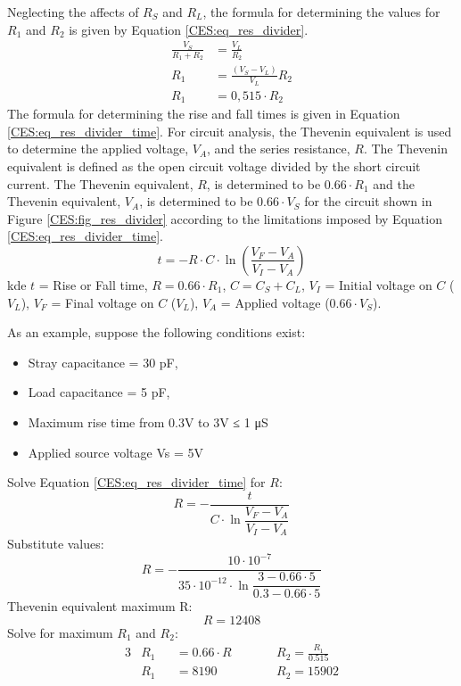         Neglecting the affects of $R_S$ and $R_L$, the formula for determining the values for $R_1$
        and $R_2$ is given by Equation \ref{CES:eq_res_divider}.
        \begin{align}\label{CES:eq_res_divider}
          \frac{V_S}{R_1+R_2} &= \frac{V_L}{R_2}           \nonumber \\
                          R_1 &= \frac{(V_S-V_L)}{V_L}R_2  \nonumber \\
                          R_1 &= 0,515\cdot R_2
        \end{align}      
        The formula for determining the rise and fall times is given in Equation
        \ref{CES:eq_res_divider_time}. For circuit analysis, the Thevenin equivalent is used to
        determine the applied voltage, $V_A$, and the series resistance, $R$.
        The Thevenin equivalent is defined as the open circuit voltage divided by the short circuit
        current. The Thevenin equivalent, $R$, is determined to be $0.66\cdot R_1$ and the Thevenin
        equivalent, $V_A$, is determined to be $0.66\cdot V_S$ for the circuit shown in  Figure
        \ref{CES:fig_res_divider} according to the limitations imposed by Equation
        \ref{CES:eq_res_divider_time}.
        \begin{equation}\label{CES:eq_res_divider_time}
          t = - R\cdot C \cdot \ln\left(\frac{V_F-V_A}{V_I-V_A}\right)
        \end{equation}  
        kde $t$ = Rise or Fall time, $R = 0.66\cdot R_1$, $C = C_S+C_L$, $V_I$ = Initial voltage on
        $C$ ($V_L$), $V_F$ = Final voltage on $C$ ($V_L$), $V_A$ = Applied voltage ($0.66\cdot V_S$). 
        \begin{example} As an example, suppose the following conditions exist:
          \begin{itemize}[noitemsep]
            \item Stray capacitance = 30 pF,
            \item Load capacitance = 5 pF,
            \item Maximum rise time from 0.3V to 3V ≤ 1 μS
            \item Applied source voltage Vs = 5V
          \end{itemize}
          Solve Equation \ref{CES:eq_res_divider_time} for $R$:  
          \begin{equation*}
            R = - \dfrac{t}{C\cdot\ln\dfrac{V_F-V_A}{V_I-V_A}}
          \end{equation*}   
          Substitute values:
          \begin{equation*}
            R = - \dfrac{10\cdot10^{-7}}{35\cdot10^{-12}\cdot
                  \ln\dfrac{3-0.66\cdot5}{0.3-0.66\cdot5}}
          \end{equation*}               
          Thevenin equivalent maximum R: $$R = 12408$$
          Solve for maximum $R_1$ and $R_2$:
          \begin{alignat}{3}
            & R_1 &&= 0.66\cdot R  \qquad &&R_2 = \frac{R_1}{0.515}  \\
            & R_1 &&= 8190         \qquad &&R_2 = 15902 
          \end{alignat}          
        \end{example} 
